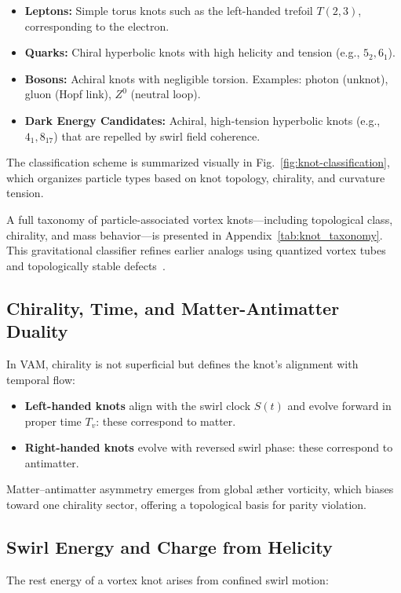 \documentclass[preprint]{revtex4-2}
\begin{document}
    \begin{itemize}
        \item \textbf{Leptons:} Simple torus knots such as the left-handed trefoil \( T(2,3) \), corresponding to the electron.
        \item \textbf{Quarks:} Chiral hyperbolic knots with high helicity and tension (e.g., \( 5_2, 6_1 \)).
        \item \textbf{Bosons:} Achiral knots with negligible torsion. Examples: photon (unknot), gluon (Hopf link), \( Z^0 \) (neutral loop).
        \item \textbf{Dark Energy Candidates:} Achiral, high-tension hyperbolic knots (e.g., \( 4_1, 8_{17} \)) that are repelled by swirl field coherence.
    \end{itemize}

    The classification scheme is summarized visually in Fig.~\ref{fig:knot-classification}, which organizes particle types based on knot topology, chirality, and curvature tension.

    A full taxonomy of particle-associated vortex knots—including topological class, chirality, and mass behavior—is presented in Appendix~\ref{tab:knot_taxonomy}. This gravitational classifier refines earlier analogs using quantized vortex tubes~\cite{volovik2003universe} and topologically stable defects~\cite{ranada1992knots}.

    \subsection{Chirality, Time, and Matter-Antimatter Duality}
    In VAM, chirality is not superficial but defines the knot’s alignment with temporal flow:

    \begin{itemize}
        \item \textbf{Left-handed knots} align with the swirl clock \( S(t) \) and evolve forward in proper time \( T_v \): these correspond to matter.
        \item \textbf{Right-handed knots} evolve with reversed swirl phase: these correspond to antimatter.
    \end{itemize}

    Matter–antimatter asymmetry emerges from global æther vorticity, which biases toward one chirality sector, offering a topological basis for parity violation.

    \subsection{Swirl Energy and Charge from Helicity}
    The rest energy of a vortex knot arises from confined swirl motion:
\end{document}
